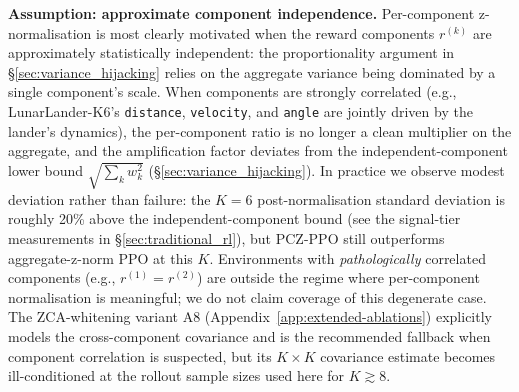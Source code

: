 \documentclass[11pt,a4paper]{article}
\begin{document}
\textbf{Assumption: approximate component independence.} Per-component z-normalisation is most clearly motivated when the reward components $r^{(k)}$ are approximately statistically independent: the proportionality argument in §\ref{sec:variance_hijacking} relies on the aggregate variance being dominated by a single component's scale. When components are strongly correlated (e.g., LunarLander-K6's \texttt{distance}, \texttt{velocity}, and \texttt{angle} are jointly driven by the lander's dynamics), the per-component ratio is no longer a clean multiplier on the aggregate, and the amplification factor deviates from the independent-component lower bound $\sqrt{\sum_k w_k^2}$ (§\ref{sec:variance_hijacking}). In practice we observe modest deviation rather than failure: the $K{=}6$ post-normalisation standard deviation is roughly 20\% above the independent-component bound (see the signal-tier measurements in §\ref{sec:traditional_rl}), but PCZ-PPO still outperforms aggregate-z-norm PPO at this $K$. Environments with \emph{pathologically} correlated components (e.g., $r^{(1)}{=}r^{(2)}$) are outside the regime where per-component normalisation is meaningful; we do not claim coverage of this degenerate case. The ZCA-whitening variant A8 (Appendix~\ref{app:extended-ablations}) explicitly models the cross-component covariance and is the recommended fallback when component correlation is suspected, but its $K{\times}K$ covariance estimate becomes ill-conditioned at the rollout sample sizes used here for $K{\gtrsim}8$.
\end{document}
